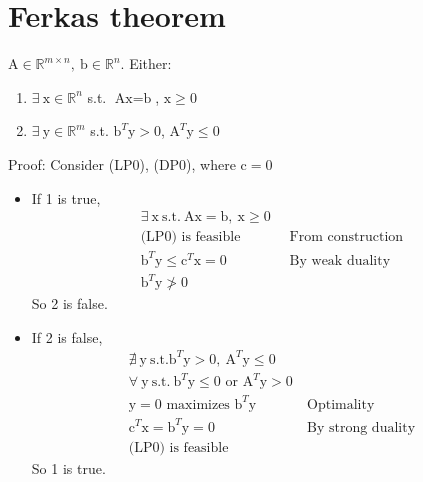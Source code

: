 \documentclass[6pt]{article}
\def\x{\textrm{x}}
\def\y{\textrm{y}}
\def\c{\textrm{c}}
\def\b{\textrm{b}}
\def\A{\textrm{A}}
\def\suchthat{\textrm{s.t.} }
\begin{document}
\section{Ferkas theorem}
$\A\in \mathbb{R}^{m\times n},~ \b\in\mathbb{R}^n$. Either:
\begin{enumerate}
    \item $\exists~ \x \in \mathbb{R}^n$ s.t. $\A\x=\b$, $\x\geq 0$
    \item $\exists~ \y \in \mathbb{R}^{m}$ s.t. $\b^T\y>0$, $\A^T\y\leq 0$
\end{enumerate}
Proof: Consider (LP0), (DP0), where $\c=0$
\begin{itemize}
    \item If 1 is true,
    \begin{align*}
    \exists ~\x~ \suchthat~ \A\x=\b,~ \x\geq 0\\
    \textrm{(LP0) is feasible} & ~\textrm{ From construction}\\
    \b^T\y\leq \c^T\x = 0 & ~\textrm{ By weak duality}\\
    \b^T\y\not> 0
    \end{align*}
    So 2 is false.
    \item If 2 is false,
    \begin{align*}
        \nexists~\y~\suchthat \b^T\y>0,~\A^T\y\leq 0\\
        \forall~\y~\suchthat~\b^T\y\leq 0 \textrm{ or } \A^T\y>0\\
        \y=0 \textrm{ maximizes } \b^T\y &~\textrm{Optimality}\\
        \c^T\x=\b^T\y=0 & ~\textrm{By strong duality}\\
        \textrm{(LP0) is feasible}
    \end{align*}{}
    So 1 is true.
\end{itemize}{}
\end{document}
